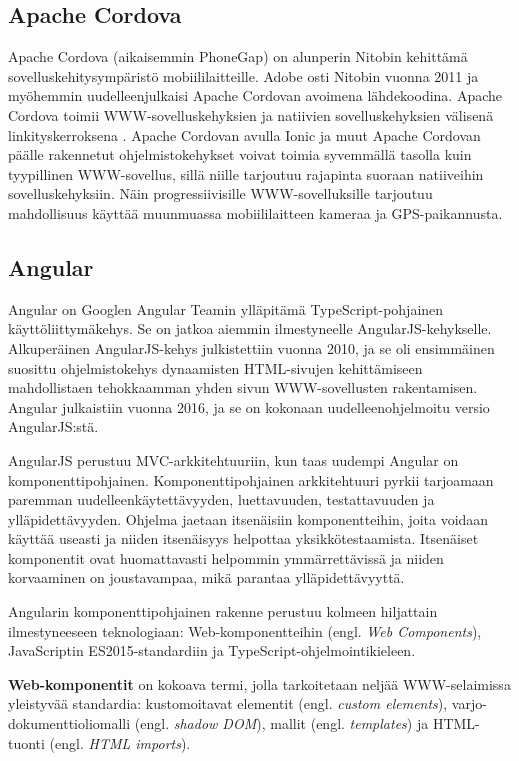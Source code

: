 \documentclass[utf8]{gradu3}
\begin{document}
\subsection{Apache Cordova}

Apache Cordova (aikaisemmin PhoneGap) on alunperin Nitobin kehittämä sovelluskehitysympäristö mobiililaitteille. Adobe osti Nitobin vuonna 2011 ja myöhemmin uudelleenjulkaisi Apache Cordovan avoimena lähdekoodina. Apache Cordova toimii WWW-sovelluskehyksien ja natiivien sovelluskehyksien välisenä linkityskerroksena \parencite[]{ionic-framework-hybrid}. Apache Cordovan avulla Ionic ja muut Apache Cordovan päälle rakennetut ohjelmistokehykset voivat toimia syvemmällä tasolla kuin tyypillinen WWW-sovellus, sillä niille tarjoutuu rajapinta suoraan natiiveihin sovelluskehyksiin. Näin progressiivisille WWW-sovelluksille tarjoutuu mahdollisuus käyttää muunmuassa mobiililaitteen kameraa ja GPS-paikannusta.

\subsection{Angular}

Angular on Googlen Angular Teamin ylläpitämä TypeScript-pohjainen käyttöliittymäkehys. Se on jatkoa aiemmin ilmestyneelle AngularJS-kehykselle. Alkuperäinen AngularJS-kehys julkistettiin vuonna 2010, ja se oli ensimmäinen suosittu ohjelmistokehys dynaamisten HTML-sivujen kehittämiseen mahdollistaen tehokkaamman yhden sivun WWW-sovellusten rakentamisen. Angular julkaistiin vuonna 2016, ja se on kokonaan uudelleenohjelmoitu versio AngularJS:stä.

AngularJS perustuu MVC-arkkitehtuuriin, kun taas uudempi Angular on komponenttipohjainen. Komponenttipohjainen arkkitehtuuri pyrkii tarjoamaan paremman uudelleenkäytettävyyden, luettavuuden, testattavuuden ja ylläpidettävyyden. Ohjelma jaetaan itsenäisiin komponentteihin, joita voidaan käyttää useasti ja niiden itsenäisyys helpottaa yksikkötestaamista. Itsenäiset komponentit ovat huomattavasti helpommin ymmärrettävissä ja niiden korvaaminen on joustavampaa, mikä parantaa ylläpidettävyyttä. \parencite[]{good-and-bad-angular} 

Angularin komponenttipohjainen rakenne perustuu kolmeen hiljattain ilmestyneeseen teknologiaan: Web-komponentteihin (engl. \textit{Web Components}), JavaScriptin ES2015-standardiin ja TypeScript-ohjelmointikieleen.

\textbf{Web-komponentit} on kokoava termi, jolla tarkoitetaan neljää WWW-selaimissa yleistyvää standardia: kustomoitavat elementit (engl. \textit{custom elements}), varjo-dokumenttioliomalli (engl. \textit{shadow DOM}), mallit (engl. \textit{templates}) ja HTML-tuonti (engl. \textit{HTML imports}). 
\end{document}
